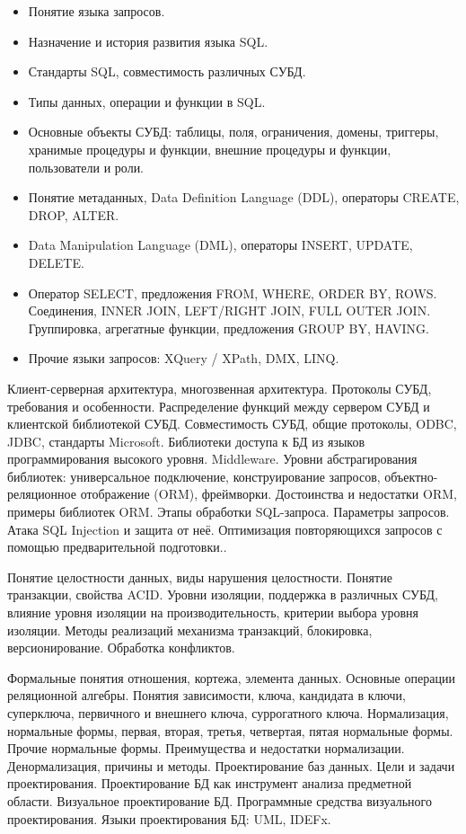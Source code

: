 \documentclass[a4paper]{article}
\begin{document}
\begin{itemize}
  \item Понятие языка запросов.
  \item Назначение и история развития языка SQL.
  \item Стандарты SQL, совместимость различных СУБД.
  \item Типы данных, операции и функции в SQL.
  \item Основные объекты СУБД: таблицы, поля, ограничения, домены, триггеры, хранимые процедуры и функции, внешние процедуры и функции, пользователи и роли.
  \item Понятие метаданных, Data Definition Language (DDL), операторы CREATE, DROP, ALTER.
  \item Data Manipulation Language (DML), операторы INSERT, UPDATE, DELETE.
  \item Оператор SELECT, предложения FROM, WHERE, ORDER BY, ROWS. Соединения, INNER JOIN, LEFT/RIGHT JOIN, FULL OUTER JOIN. Группировка, агрегатные функции, предложения GROUP BY, HAVING.
  \item Прочие языки запросов: XQuery / XPath, DMX, LINQ.
\end{itemize}

	Клиент-серверная архитектура, многозвенная архитектура. Протоколы СУБД, требования и особенности. Распределение функций между сервером СУБД и клиентской библиотекой СУБД. Совместимость СУБД, общие протоколы, ODBC, JDBC, стандарты Microsoft.
	Библиотеки доступа к БД из языков программирования высокого уровня. Middleware. Уровни абстрагирования библиотек: универсальное подключение, конструирование запросов, объектно-реляционное отображение (ORM), фреймворки. Достоинства и недостатки ORM, примеры библиотек ORM.
	Этапы обработки SQL-запроса. Параметры запросов. Атака SQL Injection и защита от неё. Оптимизация повторяющихся запросов с помощью предварительной подготовки..

	Понятие целостности данных, виды нарушения целостности.
	Понятие транзакции, свойства ACID.
	Уровни изоляции, поддержка в различных СУБД, влияние уровня изоляции на производительность, критерии выбора уровня изоляции.
	Методы реализаций механизма транзакций, блокировка, версионирование. Обработка конфликтов.

	Формальные понятия отношения, кортежа, элемента данных. Основные операции реляционной алгебры.
	Понятия зависимости, ключа, кандидата в ключи, суперключа, первичного и внешнего ключа, суррогатного ключа.
	Нормализация, нормальные формы, первая, вторая, третья, четвертая, пятая нормальные формы. Прочие нормальные формы.
	Преимущества и недостатки нормализации. Денормализация, причины и методы.
	Проектирование баз данных. Цели и задачи проектирования. Проектирование БД как инструмент анализа предметной области.
	Визуальное проектирование БД. Программные средства визуального проектирования. Языки проектирования БД: UML, IDEFx.
\end{document}
